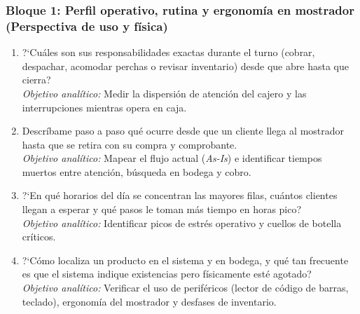 \subsubsection*{Bloque 1: Perfil operativo, rutina y ergonom\'ia en mostrador (Perspectiva de uso y f\'isica)}
\begin{enumerate}[label=\textbf{P\arabic*.},leftmargin=26pt,itemsep=3pt]
    \item ?`Cu\'ales son sus responsabilidades exactas durante el turno (cobrar, despachar, acomodar perchas o revisar inventario) desde que abre hasta que cierra?\\
    {\footnotesize\textit{Objetivo anal\'itico:} Medir la dispersi\'on de atenci\'on del cajero y las interrupciones mientras opera en caja.}
    \item Descr\'ibame paso a paso qu\'e ocurre desde que un cliente llega al mostrador hasta que se retira con su compra y comprobante.\\
    {\footnotesize\textit{Objetivo anal\'itico:} Mapear el flujo actual (\emph{As-Is}) e identificar tiempos muertos entre atenci\'on, b\'usqueda en bodega y cobro.}
    \item ?`En qu\'e horarios del d\'ia se concentran las mayores filas, cu\'antos clientes llegan a esperar y qu\'e pasos le toman m\'as tiempo en horas pico?\\
    {\footnotesize\textit{Objetivo anal\'itico:} Identificar picos de estr\'es operativo y cuellos de botella cr\'iticos.}
    \item ?`C\'omo localiza un producto en el sistema y en bodega, y qu\'e tan frecuente es que el sistema indique existencias pero f\'isicamente est\'e agotado?\\
    {\footnotesize\textit{Objetivo anal\'itico:} Verificar el uso de perif\'ericos (lector de c\'odigo de barras, teclado), ergonom\'ia del mostrador y desfases de inventario.}
\end{enumerate}

